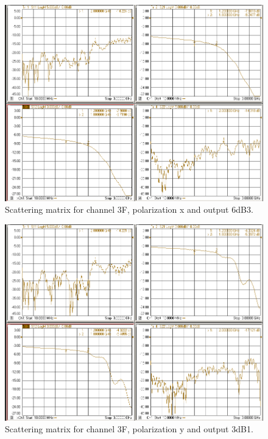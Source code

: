 \documentclass[12pt,a4paper,oneside]{article}
\begin{document}
\begin{figure}[H]
\centering
\includegraphics[width=0.9\linewidth]{VNA_results/3Fx_6dB3.png}
\caption{Scattering matrix for channel 3F, polarization x and output 6dB3.}
\label{fig:3Fx_6dB3}
\end{figure}


\begin{figure}[H]
\centering
\includegraphics[width=0.9\linewidth]{VNA_results/3Fy_3dB1.png}
\caption{Scattering matrix for channel 3F, polarization y and output 3dB1.}
\label{fig:3Fy_3dB1}
\end{figure}
\end{document}
